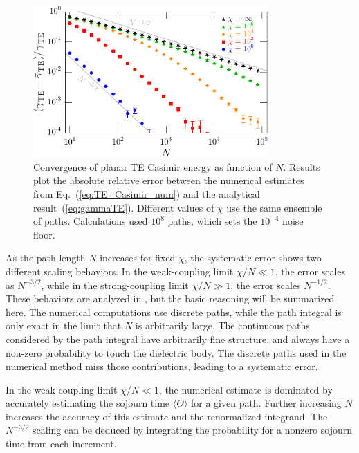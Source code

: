 \begin{figure}
  \centering
  \includegraphics[width=0.8\textwidth]{fig/temp/conv_TE2wallN3}
  \caption[Convergence of planar TE Casimir energy as function of $N$ for various $\chi$.]{
    Convergence of planar TE Casimir energy as function of $N$.  Results plot the 
    absolute relative error between the numerical estimates from Eq.~(\ref{eq:TE_Casimir_num})
    and the analytical result~(\ref{eq:gammaTE}).
    Different values of $\chi$ use the same ensemble of paths.
    Calculations used $10^8$ paths, which sets the $10^{-4}$ noise floor.}
  \label{fig:conv_wall}
\end{figure}

As the path length $N$ increases for fixed $\chi$, the systematic error shows two different scaling behaviors.  
In the weak-coupling limit $\chi/N\ll 1$, the error scales as $N^{-3/2}$, while in the strong-coupling limit
$\chi/N\gg 1$, the error scales $N^{-1/2}$.  
These behaviors are analyzed in \citet{Mackrory2016}, but the basic reasoning will be summarized here.
The numerical computations use discrete paths, 
while the path integral is only exact in the limit that $N$ is arbitrarily large.  The continuous paths considered by the path integral
have arbitrarily fine structure, and always have a non-zero probability to touch the dielectric body.
The discrete paths used in the numerical method miss those contributions, leading to a systematic error.  

In the weak-coupling limit $\chi/N\ll 1$, the numerical estimate is dominated by accurately estimating the sojourn
time $\langle\Theta\rangle$ for a given path.  Further increasing $N$ increases the accuracy of this 
estimate and the renormalized integrand.  The $N^{-3/2}$ scaling can be deduced by integrating the probability for a nonzero sojourn time
from each increment.  

